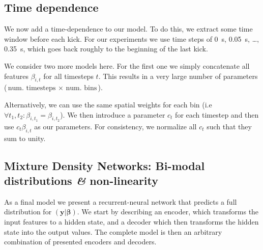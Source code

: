 \documentclass[nobib]{tufte-handout}
\begin{document}
\subsection{Time dependence}
\begin{marginfigure}
 \caption{Situation considered here:
   We model the heading change of the red fish given the trajectory of the other fish.
 The trajectory of the red fish is implicitely encoded in the receptive field as we consider the position of the other fish in the local coordinate system at each point of red's trajectory.}
\end{marginfigure}
We now add a time-dependence to our model.
To do this, we extract some time window before each kick.
For our experiments we use time steps of \SI{0}{\s}, \SI{0.05}{s}, \ldots, \SI{0.35}{\s}, which goes back roughly to the beginning of the last kick.

We consider two more models here.
For the first one we simply concatenate all features \(\beta_{i, t}\) for all timesteps \(t\).
This results in a very large number of parameters (\(\text{num. timesteps } \times \text{ num. bins}\)).

Alternatively, we can use the same spatial weights for each bin (i.e\ \( \forall t_1, t_2: \beta_{i, t_1} = \beta_{i, t_2}\)).
We then introduce a parameter \(c_t\) for each timestep and then use $c_t \beta_{i,t}$ as our parameters.
For consistency, we normalize all \(c_t\) such that they sum to unity.

\subsection{Mixture Density Networks: Bi-modal distributions \textit{\&} non-linearity}
As a final model we present a recurrent-neural network that predicts a full distribution for \(\left( \bm{y} | \bm{\beta} \right)\).
We start by describing an encoder, which transforms the input features to a hidden state, and a decoder which then transforms the hidden state into the output values.
The complete model is then an arbitrary combination of presented encoders and decoders.
\end{document}
